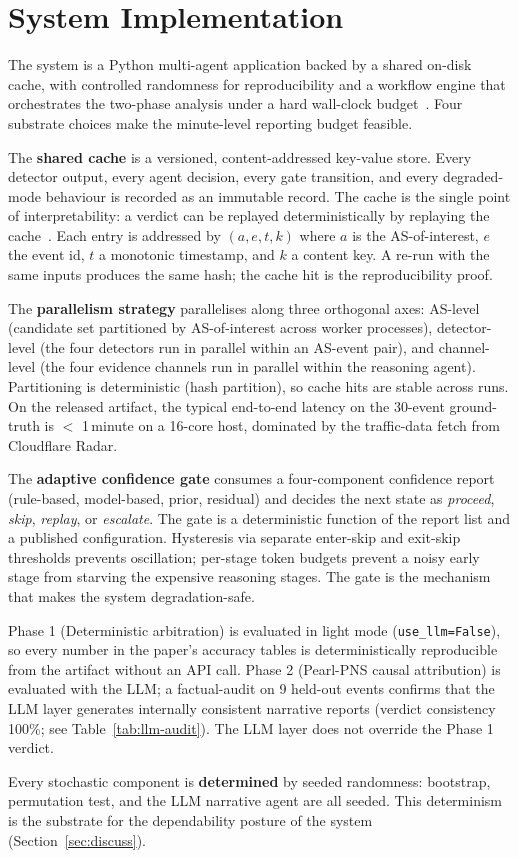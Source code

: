 \section{System Implementation}
\label{sec:impl}

The system is a Python multi-agent application backed
by a shared on-disk cache, with controlled randomness
for reproducibility and a workflow engine that
orchestrates the two-phase analysis under a hard
wall-clock budget~\cite{bgpstream}. Four substrate choices make the
minute-level reporting budget feasible.

The \textbf{shared cache} is a versioned,
content-addressed key-value store. Every detector output,
every agent decision, every gate transition, and every
degraded-mode behaviour is recorded as an immutable record.
The cache is the single point of interpretability: a
verdict can be replayed deterministically by replaying
the cache~\cite{caida-asrank,caida-asrel}. Each entry is addressed by $(a, e, t, k)$
where $a$ is the AS-of-interest, $e$ the event id, $t$
a monotonic timestamp, and $k$ a content key. A re-run
with the same inputs produces the same hash; the cache
hit is the reproducibility proof.

The \textbf{parallelism strategy} parallelises along three
orthogonal axes: AS-level (candidate set partitioned by
AS-of-interest across worker processes), detector-level
(the four detectors run in parallel within an AS-event
pair), and channel-level (the four evidence channels
run in parallel within the reasoning agent). Partitioning
is deterministic (hash partition), so cache hits are
stable across runs. On the released artifact, the typical
end-to-end latency on the 30-event ground-truth is
$<$ 1\,minute on a 16-core host, dominated by the
traffic-data fetch from Cloudflare Radar.

The \textbf{adaptive confidence gate} consumes a
four-component confidence report (rule-based,
model-based, prior, residual) and decides the next state
as \emph{proceed}, \emph{skip}, \emph{replay}, or
\emph{escalate}. The gate is a deterministic function
of the report list and a published configuration.
Hysteresis via separate enter-skip and exit-skip
thresholds prevents oscillation; per-stage token budgets
prevent a noisy early stage from starving the expensive
reasoning stages. The gate is the mechanism that makes
the system degradation-safe.

Phase 1 (Deterministic arbitration) is evaluated in
light mode (\texttt{use\_llm=False}), so every number in
the paper's accuracy tables is deterministically
reproducible from the artifact without an API call.
Phase 2 (Pearl-PNS causal attribution) is evaluated
with the LLM; a factual-audit on 9 held-out events
confirms that the LLM layer generates internally
consistent narrative reports (verdict consistency 100\%;
see Table~\ref{tab:llm-audit}). The LLM layer does not
override the Phase 1 verdict.

Every stochastic component is \textbf{determined} by seeded
randomness: bootstrap, permutation test, and the LLM
narrative agent are all seeded. This determinism is the
substrate for the dependability posture of the system
(Section~\ref{sec:discuss}).

